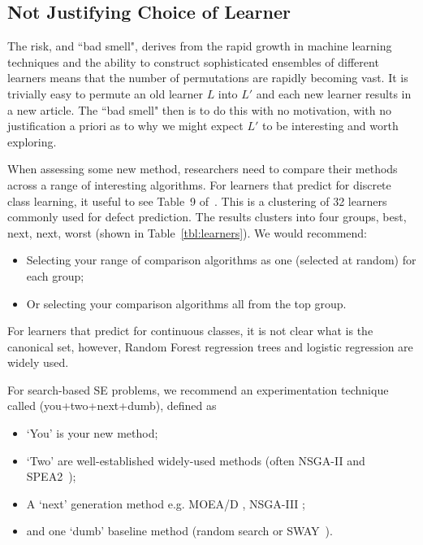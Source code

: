 \documentclass[preprint,10pt]{elsarticle}
\begin{document}
 
\subsection{Not Justifying Choice of Learner} \label{ref:learner}

The risk, and ``bad smell", derives from the rapid growth in machine learning techniques and the ability to construct sophisticated ensembles of different learners means that the number of permutations are rapidly becoming vast.  It is trivially easy to permute an old learner $L$ into $L'$ and each new learner results in a new article.  The ``bad smell" then is to do this with no motivation, with no justification a priori as to why we might expect $L'$ to be interesting and worth exploring.

When assessing some new method, researchers need to compare their methods across a range of interesting algorithms.  For learners that predict for discrete class learning,  it useful to see Table~9 of~\cite{ghotra2015}. This is a clustering of 32 learners commonly used for defect prediction. The results clusters into four groups, best, next, next, worst
(shown in Table~\ref{tbl:learners}). We would recommend:
\begin{itemize}
\item
Selecting your range of comparison algorithms as one (selected at random) for each group;
\item 
Or selecting your comparison algorithms all from the top group.
\end{itemize}

For learners that predict for continuous classes, it is not clear what is the canonical set, however, Random Forest regression trees and logistic regression are widely used. 
 
For search-based SE problems, we recommend an experimentation technique called (you+two+next+dumb), defined as
\begin{itemize}
\item
`You' is your new method;
\item
`Two' are well-established widely-used methods (often NSGA-II and SPEA2~\cite{sayyad2013});
\item A `next' generation method e.g. MOEA/D \cite{zhang2007moea}, NSGA-III \cite{deb14};
\item and one `dumb' baseline method (random search or SWAY~\cite{chen2018}).
\end{itemize}

 

 
\end{document}
